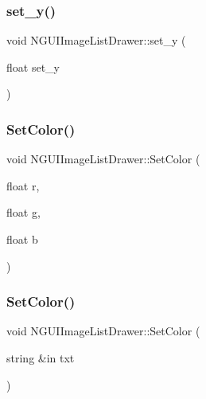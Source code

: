 \hypertarget{class_n_g_u_i_image_list_drawer_a5b2545174c3dbc2d48d9057d8f9e0139}{}\label{class_n_g_u_i_image_list_drawer_a5b2545174c3dbc2d48d9057d8f9e0139} 
\subsubsection{\texorpdfstring{set\+\_\+y()}{set\_y()}}
{\footnotesize\ttfamily void N\+G\+U\+I\+Image\+List\+Drawer\+::set\+\_\+y (\begin{DoxyParamCaption}\item[{float}]{set\+\_\+y }\end{DoxyParamCaption})}

\hypertarget{class_n_g_u_i_image_list_drawer_ace85f8075db21f0a733510235504c9f4}{}\label{class_n_g_u_i_image_list_drawer_ace85f8075db21f0a733510235504c9f4} 
\subsubsection{\texorpdfstring{Set\+Color()}{SetColor()}\hspace{0.1cm}{\footnotesize\ttfamily [1/2]}}
{\footnotesize\ttfamily void N\+G\+U\+I\+Image\+List\+Drawer\+::\+Set\+Color (\begin{DoxyParamCaption}\item[{float}]{r,  }\item[{float}]{g,  }\item[{float}]{b }\end{DoxyParamCaption})}

\hypertarget{class_n_g_u_i_image_list_drawer_a347b64d005924e10745091e2547091cd}{}\label{class_n_g_u_i_image_list_drawer_a347b64d005924e10745091e2547091cd} 
\subsubsection{\texorpdfstring{Set\+Color()}{SetColor()}\hspace{0.1cm}{\footnotesize\ttfamily [2/2]}}
{\footnotesize\ttfamily void N\+G\+U\+I\+Image\+List\+Drawer\+::\+Set\+Color (\begin{DoxyParamCaption}\item[{string \&in}]{txt }\end{DoxyParamCaption})}

